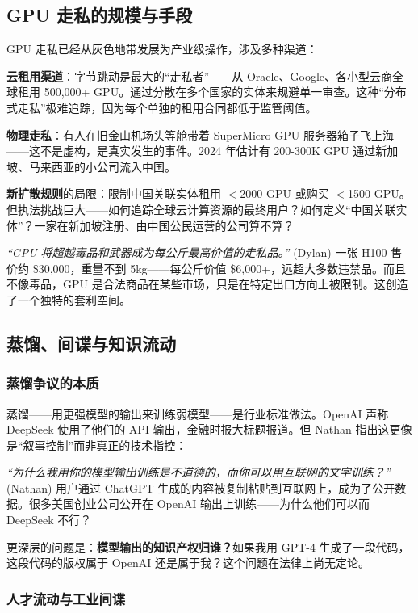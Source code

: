 \documentclass[a4paper]{article}
\begin{document}
\subsection{GPU 走私的规模与手段}

GPU 走私已经从灰色地带发展为产业级操作，涉及多种渠道：

\textbf{云租用渠道}：字节跳动是最大的``走私者''——从 Oracle、Google、各小型云商全球租用 500,000+ GPU。通过分散在多个国家的实体来规避单一审查。这种``分布式走私''极难追踪，因为每个单独的租用合同都低于监管阈值。

\textbf{物理走私}：有人在旧金山机场头等舱带着 SuperMicro GPU 服务器箱子飞上海——这不是虚构，是真实发生的事件。2024 年估计有 200-300K GPU 通过新加坡、马来西亚的小公司流入中国。

\textbf{新扩散规则}的局限：限制中国关联实体租用 $<$2000 GPU 或购买 $<$1500 GPU。但执法挑战巨大——如何追踪全球云计算资源的最终用户？如何定义``中国关联实体''？一家在新加坡注册、由中国公民运营的公司算不算？

\textit{``GPU 将超越毒品和武器成为每公斤最高价值的走私品。''} (Dylan) 一张 H100 售价约 \$30,000，重量不到 5kg——每公斤价值 \$6,000+，远超大多数违禁品。而且不像毒品，GPU 是合法商品在某些市场，只是在特定出口方向上被限制。这创造了一个独特的套利空间。

\subsection{蒸馏、间谍与知识流动}

\subsubsection{蒸馏争议的本质}

蒸馏——用更强模型的输出来训练弱模型——是行业标准做法。OpenAI 声称 DeepSeek 使用了他们的 API 输出，金融时报大标题报道。但 Nathan 指出这更像是``叙事控制''而非真正的技术指控：

\textit{``为什么我用你的模型输出训练是不道德的，而你可以用互联网的文字训练？''} (Nathan) 用户通过 ChatGPT 生成的内容被复制粘贴到互联网上，成为了公开数据。很多美国创业公司公开在 OpenAI 输出上训练——为什么他们可以而 DeepSeek 不行？

更深层的问题是：\textbf{模型输出的知识产权归谁？}如果我用 GPT-4 生成了一段代码，这段代码的版权属于 OpenAI 还是属于我？这个问题在法律上尚无定论。

\subsubsection{人才流动与工业间谍}
\end{document}
